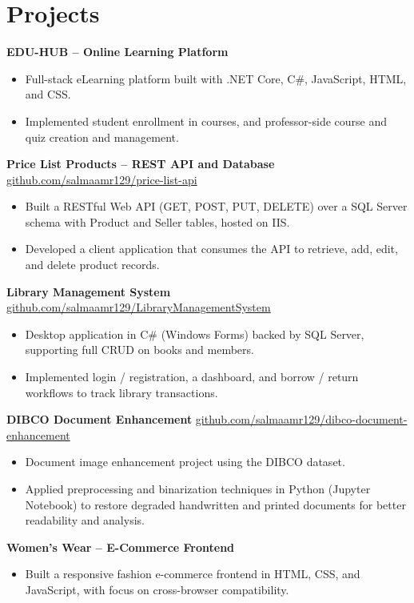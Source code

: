 \section*{Projects}

\textbf{EDU-HUB -- Online Learning Platform}
\begin{itemize}
    \item Full-stack eLearning platform built with .NET Core, C\#,
          JavaScript, HTML, and CSS.
    \item Implemented student enrollment in courses, and professor-side
          course and quiz creation and management.
\end{itemize}

\vspace{4pt}
\textbf{Price List Products -- REST API and Database} \hfill
\href{https://github.com/salmaamr129/price-list-api}{github.com/salmaamr129/price-list-api}
\begin{itemize}
    \item Built a RESTful Web API (GET, POST, PUT, DELETE) over a SQL Server
          schema with Product and Seller tables, hosted on IIS.
    \item Developed a client application that consumes the API to retrieve,
          add, edit, and delete product records.
\end{itemize}

\vspace{4pt}
\textbf{Library Management System} \hfill
\href{https://github.com/salmaamr129/LibraryManagementSystem}{github.com/salmaamr129/LibraryManagementSystem}
\begin{itemize}
    \item Desktop application in C\# (Windows Forms) backed by SQL Server,
          supporting full CRUD on books and members.
    \item Implemented login / registration, a dashboard, and borrow / return
          workflows to track library transactions.
\end{itemize}

\vspace{4pt}
\textbf{DIBCO Document Enhancement} \hfill
\href{https://github.com/salmaamr129/dibco-document-enhancement}{github.com/salmaamr129/dibco-document-enhancement}
\begin{itemize}
    \item Document image enhancement project using the DIBCO dataset.
    \item Applied preprocessing and binarization techniques in Python
          (Jupyter Notebook) to restore degraded handwritten and printed
          documents for better readability and analysis.
\end{itemize}

\vspace{4pt}
\textbf{Women's Wear -- E-Commerce Frontend}
\begin{itemize}
    \item Built a responsive fashion e-commerce frontend in HTML, CSS, and
          JavaScript, with focus on cross-browser compatibility.
\end{itemize}
